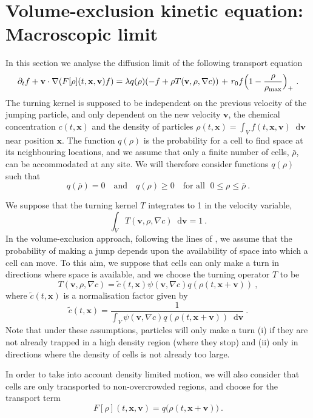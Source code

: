 \documentclass[review,onefignum,onetabnum]{siamart220329}
\newcommand*\diff{\mathop{}\!\mathrm{d}}
\begin{document}
\section{Volume-exclusion kinetic equation: Macroscopic limit}
\label{sec:model}
In this section we analyse the diffusion limit of the following transport equation
\begin{equation*}
    \partial_t f+\mathbf{v}\cdot \nabla(F[\rho](t,\mathbf{x},\mathbf{v}) f)= \lambda q(\rho)(-f+\rho T(\mathbf{v},\rho,\nabla c)){\ +\ r_0f\Bigl(1-\frac{\rho}{\rho_{\textnormal{max}}} \Bigr)_+}\ .
\end{equation*}
The turning kernel is supposed to be independent on the previous velocity of the jumping particle, and only dependent on the new velocity $\mathbf{v}$, the chemical concentration $c(t,\mathbf{x})$ and the density of particles $\rho(t,\mathbf{x})=\int_V f(t,\textbf{x},\mathbf{v})\diff \mathbf{v}$ near position $\mathbf{x}$.
\noindent The function $q(\rho)$ is the probability {for a cell to find} space at its neighbouring locations, and we assume that only a finite number of cells, $\bar{\rho}$, can be accommodated at any site. We will therefore consider functions $q(\rho)$ such that
$$
q(\bar{\rho}) = 0 \quad \text{and} \quad q(\rho) \geq 0 \quad \text{for all } \; 0\leq \rho \leq \bar{\rho}\ .
$$

We {suppose that the turning kernel $T$ integrates to 1 in the velocity variable},
$$
\int_V T(\textbf{v},\rho,\nabla c)\diff \mathbf{v}=1\ .
$$
In the volume-exclusion approach, following the lines of \cite{Hillen2009}, we assume that the probability of making a jump depends upon the availability of space into which {{a cell}} can move. To this aim, we suppose that cells can only make a turn in directions where space is available, and we choose the turning operator $T$ to be
\begin{equation*}
    T(\mathbf{v},\rho,\nabla c)=\tilde{c}(t,\mathbf{x})\psi(\mathbf{v},\nabla c) q(\rho(t,\mathbf{x}+ \mathbf{v}))\ ,
\end{equation*}
\noindent where $\tilde{c}(t,\mathbf{x})$ is a normalisation factor given by
\[
\tilde{c}(t,\mathbf{x})=\frac{1}{\displaystyle\int_{V} \psi(\mathbf{v},\nabla c) q(\rho(t,\mathbf{x}+ \mathbf{v}))\diff \mathbf{v} }\ .
\]
\noindent Note that under these assumptions, particles will only make a turn (i) if they are not already trapped in a high density region (where they stop) and (ii) only in directions where the density of cells is not already too large. 

In order to take into account density limited motion, we will also consider that cells are only transported to non-overcrowded regions, and choose for the transport term
\begin{equation*}
F[\rho](t,\mathbf{x},\mathbf{v}) = q\big(\rho(t,\mathbf{x}+\mathbf{v})\big)\ .
\end{equation*}
\end{document}
